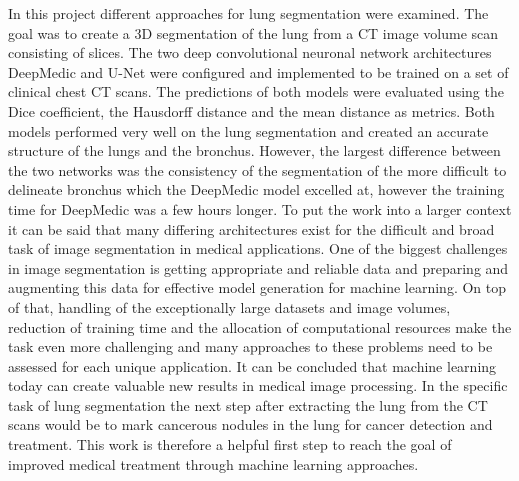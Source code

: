 
In this project different approaches for lung segmentation were examined. The goal was to create a 3D segmentation of the lung from a CT image volume scan consisting of slices. The two deep convolutional neuronal network architectures DeepMedic and U-Net were configured and implemented to be trained on a set of clinical chest CT scans. The predictions of both models were evaluated using the Dice coefficient, the Hausdorff distance and the mean distance as metrics. Both models performed very well on the lung segmentation and created an accurate structure of the lungs and the bronchus. However, the largest difference between the two networks was the consistency of the segmentation of the more difficult to delineate bronchus which the DeepMedic model excelled at, however the training time for DeepMedic was a few hours longer.\newline
To put the work into a larger context it can be said that many differing architectures exist for the difficult and broad task of image segmentation in medical applications. One of the biggest challenges in image segmentation is getting appropriate and reliable data and preparing and augmenting this data for effective model generation for machine learning. On top of that, handling of the exceptionally large datasets and image volumes, reduction of training time and the allocation of computational resources make the task even more challenging and many approaches to these problems need to be assessed for each unique application.\newline
It can be concluded that machine learning today can create valuable new results in medical image processing. In the specific task of lung segmentation the next step after extracting the lung from the CT scans would be to mark cancerous nodules in the lung for cancer detection and treatment. This work is therefore a helpful first step to reach the goal of improved medical treatment through machine learning approaches.